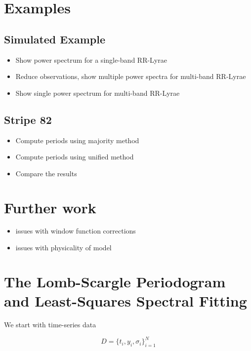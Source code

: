 \documentclass[12pt,preprint]{aastex}
\begin{document}
\section{Examples}
\subsection{Simulated Example}

\begin{itemize}
  \item Show power spectrum for a single-band RR-Lyrae
  \item Reduce observations, show multiple power spectra for multi-band RR-Lyrae
  \item Show single power spectrum for multi-band RR-Lyrae
\end{itemize}

\subsection{Stripe 82}

\begin{itemize}
  \item Compute periods using majority method
  \item Compute periods using unified method
  \item Compare the results
\end{itemize}

\section{Further work}

\begin{itemize}
  \item issues with window function corrections
  \item issues with physicality of model
\end{itemize}






\appendix


\section{The Lomb-Scargle Periodogram and Least-Squares Spectral Fitting}

We start with time-series data

\begin{equation}
  D = \{t_i,y_i,\sigma_i\}_{i=1}^N
\end{equation}
\end{document}
